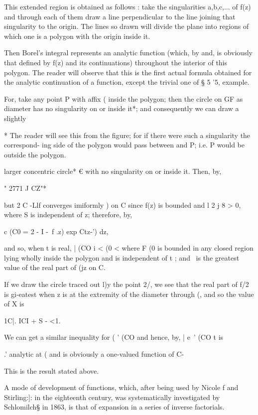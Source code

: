 {This extended region is obtained as follows : take the singularities
a,b,c,... of f(z) and through each of them draw a line perpendicular
to the line joining that singularity to the origin. The lines so drawn
will divide the plane into regions of which one is a polygon with the
origin inside it.

Then Borel's integral represents an analytic function (which, by
and, is obviously that defined by f(z) and its continuations)
throughout the interior of this polygon. The reader will observe that
this is the first actual formula obtained for the analytic
continuation of a function, except the trivial one of § 5 '5, example.

For, take any point P with affix ( inside the polygon; then the circle
on GF as diameter has no singularity on or inside it*; and
consequently we can draw a slightly

* The reader will see this from the figure; for if there were such a
singularity the correspond- ing side of the polygon would pass between
and P; i.e. P would be outside the polygon.
%
%

larger concentric circle* € with no singularity on or inside it. Then,
by,

" 2771 J CZ"*

but 2 C -Llf converges imiformly ) on C since f(z) is bounded
and l 2 j 8 > 0, where S is independent of z; therefore, by,

c (C0 = 2 - I -\ f .z) exp Ctz-') dz,

and so, when t is real, | (CO i < (0 < where F (0 is bounded in any
closed region lying wholly inside the polygon and is independent of t
; and \ is the greatest value of the real part of (jz on C.

If we draw the circle traced out l)y the point 2/, we see that the
real part of f/2 is gi-eatest when z is at the extremity of the
diameter through (, and so the value of X is

1C|. ICI + S - <1.

We can get a similar inequality for ( ' (CO and hence, by, |
e~' (CO t is

.' analytic at ( and is obviously a one-valued function of C-

This is the result stated above.

A mode of development of functions, which, after being used by Nicole
f and Stirling:]: in the eighteenth century, was systematically
investigated by Schlomilch§ in 1863, is that of expansion in a series
of inverse factorials.

}
